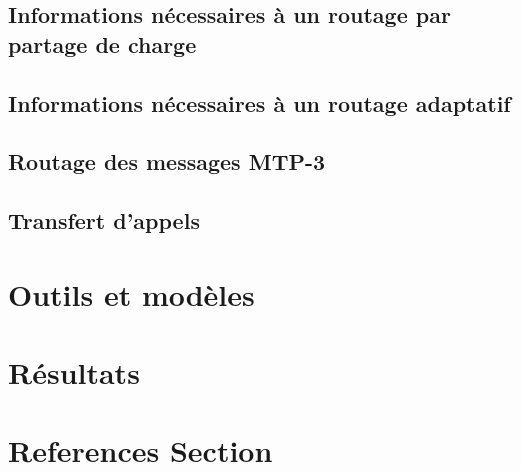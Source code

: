 \documentclass[lettersize,journal]{IEEEtran} %
\begin{document}
\subsection{Informations nécessaires à un routage par partage de charge}

\subsection{Informations nécessaires à un routage adaptatif}

\subsection{Routage des messages MTP-3}

\subsection{Transfert d'appels}

\section{Outils et modèles}
\section{Résultats}


\section{References Section}
\end{document}
